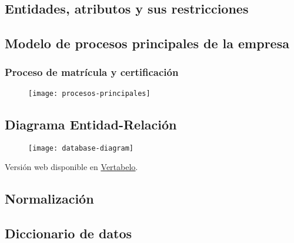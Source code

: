 \documentclass[../main.tex]{subfiles}
\begin{document}
\subsection{Entidades, atributos y sus restricciones}



\subsection{Modelo de procesos principales de la empresa}

\subsubsection{Proceso de matrícula y certificación}

\begin{figure}[H]
  \centering
  \texttt{[image: procesos-principales]}
\end{figure}

\subsection{Diagrama Entidad-Relación}

\begin{figure}[H]
  \centering
  \texttt{[image: database-diagram]}
\end{figure}

Versión web disponible en \href{https://my.vertabelo.com/public-model-view/ukHs6uqjUATeSLbRCSPE2cxNynnT7Ih2eVq5pHasMIKzGy4rT7edH539Oo9ElxhI?x=2064&y=2305&zoom=0.3617}{\underline{Vertabelo}}.

\subsection{Normalización}



\subsection{Diccionario de datos}


\end{document}
